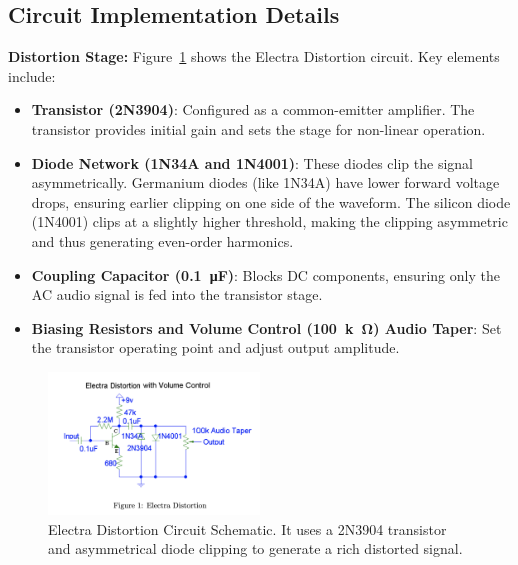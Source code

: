 \documentclass[12pt,a4paper]{article}
\begin{document}
\subsection{Circuit Implementation Details}
\textbf{Distortion Stage:}  
Figure~\ref{fig:distortion} shows the Electra Distortion circuit. Key elements include:
\begin{itemize}
    \item \textbf{Transistor (2N3904)}: Configured as a common-emitter amplifier. The transistor provides initial gain and sets the stage for non-linear operation.
    \item \textbf{Diode Network (1N34A and 1N4001)}: These diodes clip the signal asymmetrically. Germanium diodes (like 1N34A) have lower forward voltage drops, ensuring earlier clipping on one side of the waveform. The silicon diode (1N4001) clips at a slightly higher threshold, making the clipping asymmetric and thus generating even-order harmonics.
    \item \textbf{Coupling Capacitor (\SI{0.1}{\micro\farad})}: Blocks DC components, ensuring only the AC audio signal is fed into the transistor stage.
    \item \textbf{Biasing Resistors and Volume Control (\SI{100}{k\ohm}) Audio Taper}: Set the transistor operating point and adjust output amplitude.
\end{itemize}

\begin{figure}[h!]
\centering
\includegraphics[width=0.5\textwidth]{img/electra_distortion.png}
\caption{Electra Distortion Circuit Schematic. It uses a 2N3904 transistor and asymmetrical diode clipping to generate a rich distorted signal.}
\label{fig:distortion}
\end{figure}
\end{document}
